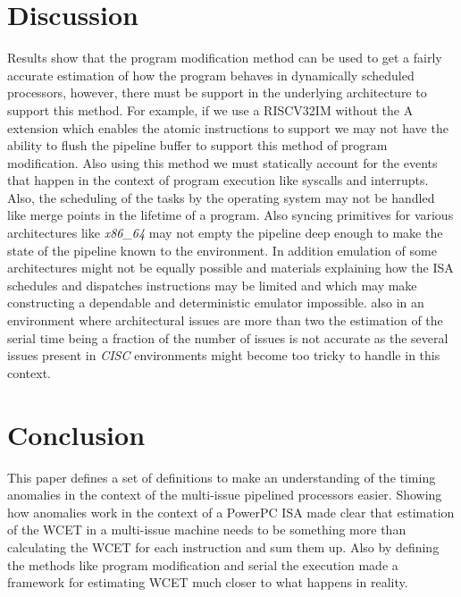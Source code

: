 \documentclass[a4paper, 11pt]{article}
\begin{document}
\section{Discussion}
Results show that the program modification method can be used to get a fairly 
accurate estimation of how the program behaves in dynamically scheduled 
processors, however, there must be support in the underlying architecture to 
support this method. For example, if we use a RISCV32IM without the A extension 
which enables the atomic instructions to support we may not have the ability 
to flush the pipeline buffer to support this method of program modification.
Also using this method we must statically account for the events that happen 
in the context of program execution like syscalls and interrupts. Also, 
the scheduling of the tasks by the operating system may not be handled like merge 
points in the lifetime of a program. Also syncing primitives for various 
architectures like \textit{x86\_64} may not empty the pipeline deep enough to 
make the state of the pipeline known to the environment. In addition emulation 
of some architectures might not be equally possible and materials explaining 
how the ISA schedules and dispatches instructions may be limited and which may 
make constructing a dependable and deterministic emulator impossible. also in
an environment where architectural issues are more than two the estimation of 
the serial time being a fraction of the number of issues is not accurate as the
several issues present in \textit{CISC} environments might become too tricky to
handle in this context.

\section{Conclusion}
This paper defines a set of definitions to make an understanding of the timing 
anomalies in the context of the multi-issue pipelined processors easier.
Showing how anomalies work in the context of a PowerPC ISA made clear 
that estimation of the WCET in a multi-issue machine
needs to be something more than calculating the WCET for each instruction and
sum them up. Also by defining the methods like program modification and serial
the execution made a framework for estimating WCET much closer to what happens
in reality.



\end{document}
